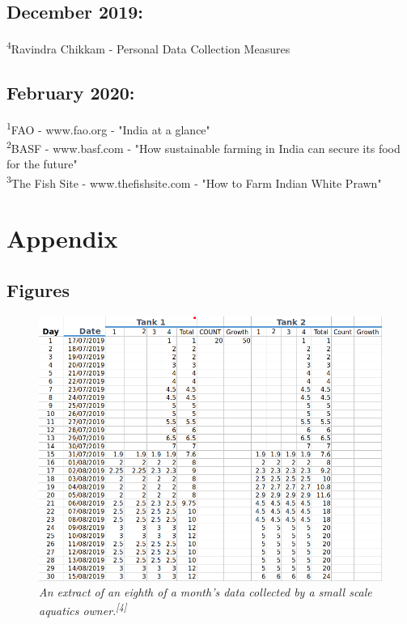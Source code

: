 \documentclass[a4paper,11pt]{proc}
\begin{document}
\subsection{December 2019:}
\textsuperscript{4}{Ravindra Chikkam - Personal Data Collection Measures}

\subsection{February 2020:}
\textsuperscript{1}{FAO - www.fao.org - "India at a glance"}\\
\textsuperscript{2}{BASF - www.basf.com - "How sustainable farming in India can secure its food for the future"}\\
\textsuperscript{3}{The Fish Site - www.thefishsite.com - "How to Farm Indian White Prawn"}

\section{Appendix}
\subsection{Figures}
\begin{figure}[p]
	\centering
	\includegraphics[width=17.2cm]{RaviData.png}
	\caption{\textit{An extract of an eighth of a month's data collected by a small scale aquatics owner.\textsuperscript{[4]}}}
\end{figure}
\end{document}
